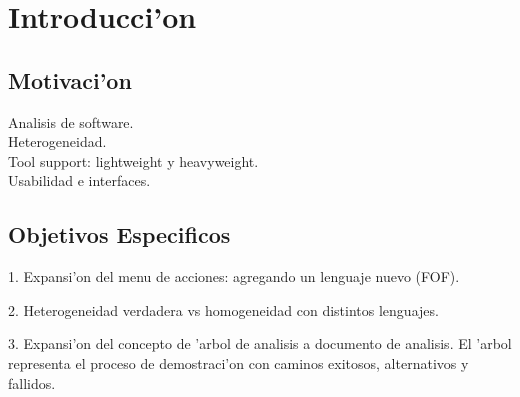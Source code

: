 \chapter{Introducci'on}
\section{Motivaci'on}

Analisis de software. \\
Heterogeneidad. \\
Tool support: lightweight y heavyweight. \\
Usabilidad e interfaces. \\

\section{Objetivos Especificos}

1. Expansi'on del menu de acciones: agregando un lenguaje nuevo (FOF). 

2. Heterogeneidad verdadera vs homogeneidad con distintos lenguajes.

3. Expansi'on del concepto de 'arbol de analisis a documento de analisis. El 'arbol representa el proceso de demostraci'on con caminos exitosos, alternativos y fallidos.